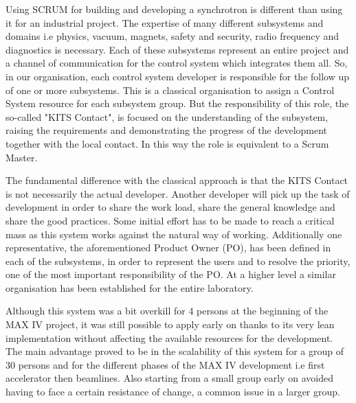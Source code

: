 \documentclass[a4paper,
              ]{jacow}
\begin{document}
Using SCRUM for building and developing a synchrotron is different than using it for an industrial project. The expertise of many different subsystems and domains i.e physics, vacuum, magnets, safety and security, radio frequency and diagnostics is necessary. Each of these subsystems represent an entire project and a channel of communication for the control system which integrates them all. 
So, in our organisation, each control system developer is responsible for the follow up of one or more subsystems. This is a classical organisation to assign a Control System resource for each subsystem group. But the responsibility of this role, the so-called "KITS Contact", is focused on the understanding of the subsystem, raising the requirements and demonstrating the progress of the development together with the local contact. In this way the role is equivalent to a Scrum Master. 

The fundamental difference with the classical approach is that the KITS Contact is not necessarily the actual developer. Another developer will pick up the task of development in order to share the work load, share the general knowledge and share the good practices. Some initial effort has to be made to reach a critical mass as this system works against the natural way of working.
Additionally one representative, the aforementioned Product Owner (PO), has been defined in each of the subsystems, in order to represent the users and to resolve the priority, one of the most important responsibility of the PO. At a higher level a similar organisation has been established for the entire laboratory.

Although this system was a bit overkill for 4 persons at the beginning of the MAX IV project, it was still possible to apply early on thanks to its very lean implementation without affecting the available resources for the development. The main advantage proved to be in the scalability of this system for a group of 30 persons and for the different phases of the MAX IV development i.e first accelerator then beamlines. Also starting from a small group early on avoided having to face a certain resistance of change, a common issue in a larger group.
\end{document}
